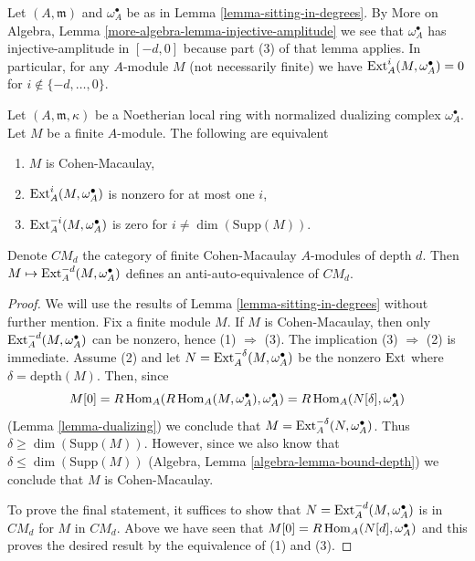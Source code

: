 \begin{remark}
\label{remark-vanishing-for-arbitrary-modules}
Let $(A, \mathfrak m)$ and $\omega_A^\bullet$ be as in
Lemma \ref{lemma-sitting-in-degrees}.
By More on Algebra, Lemma \ref{more-algebra-lemma-injective-amplitude}
we see that $\omega_A^\bullet$ has injective-amplitude in $[-d, 0]$
because part (3) of that lemma applies.
In particular, for any $A$-module $M$ (not necessarily finite) we have
$\mathop{\mathrm{Ext}}\nolimits^i_A(M, \omega_A^\bullet) = 0$ for $i \not \in \{-d, \ldots, 0\}$.
\end{remark}

\begin{lemma}
\label{lemma-local-CM}
Let $(A, \mathfrak m, \kappa)$ be a Noetherian local ring
with normalized dualizing complex $\omega_A^\bullet$. Let $M$
be a finite $A$-module. The following are equivalent
\begin{enumerate}
\item $M$ is Cohen-Macaulay,
\item $\mathop{\mathrm{Ext}}\nolimits^i_A(M, \omega_A^\bullet)$ is nonzero for at most one $i$,
\item $\mathop{\mathrm{Ext}}\nolimits^{-i}_A(M, \omega_A^\bullet)$ is zero for
$i \not = \dim(\text{Supp}(M))$.
\end{enumerate}
Denote $CM_d$ the category of finite Cohen-Macaulay $A$-modules
of depth $d$. Then $M \mapsto \mathop{\mathrm{Ext}}\nolimits^{-d}_A(M, \omega_A^\bullet)$
defines an anti-auto-equivalence of $CM_d$.
\end{lemma}

\begin{proof}
We will use the results of Lemma \ref{lemma-sitting-in-degrees}
without further mention. Fix a finite module $M$.
If $M$ is Cohen-Macaulay, then only
$\mathop{\mathrm{Ext}}\nolimits^{-d}_A(M, \omega_A^\bullet)$ can be nonzero,
hence (1) $\Rightarrow$ (3).
The implication (3) $\Rightarrow$ (2) is immediate.
Assume (2) and let $N = \mathop{\mathrm{Ext}}\nolimits^{-\delta}_A(M, \omega_A^\bullet)$
be the nonzero $\mathop{\mathrm{Ext}}\nolimits$ where $\delta = \text{depth}(M)$. Then, since
$$
M[0] = R\mathop{\mathrm{Hom}}\nolimits_A(R\mathop{\mathrm{Hom}}\nolimits_A(M, \omega_A^\bullet), \omega_A^\bullet) =
R\mathop{\mathrm{Hom}}\nolimits_A(N[\delta], \omega_A^\bullet)
$$
(Lemma \ref{lemma-dualizing})
we conclude that $M = \mathop{\mathrm{Ext}}\nolimits_A^{-\delta}(N, \omega_A^\bullet)$.
Thus $\delta \geq \dim(\text{Supp}(M))$. However,
since we also know that $\delta \leq \dim(\text{Supp}(M))$
(Algebra, Lemma \ref{algebra-lemma-bound-depth}) we conclude that $M$ is
Cohen-Macaulay.

\medskip\noindent
To prove the final statement, it suffices to show that
$N = \mathop{\mathrm{Ext}}\nolimits^{-d}_A(M, \omega_A^\bullet)$ is in $CM_d$
for $M$ in $CM_d$. Above we have seen that
$M[0] = R\mathop{\mathrm{Hom}}\nolimits_A(N[d], \omega_A^\bullet)$ and this proves the
desired result by the equivalence of (1) and (3).
\end{proof}

